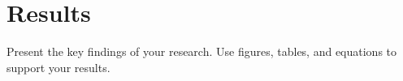\chapter{Results}

Present the key findings of your research. Use figures, tables, and equations to support your results.

